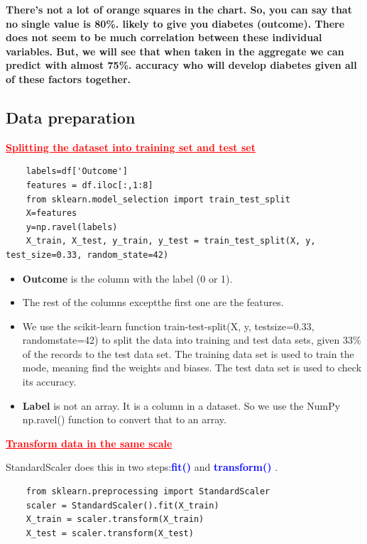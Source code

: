    \textbf{There’s not a lot of orange squares in the chart. 
    So, you can say that no single value is 80\%. 
    likely to give you diabetes (outcome). 
    There does not seem to be much correlation between these
     individual variables. But, we will see that when taken in 
     the aggregate we can predict with almost 75\%. accuracy 
    who will develop diabetes given all of these factors together.
   }
\subsection{Data preparation}
\label{sec:data}
\textcolor{red}{\underline{\textbf{Splitting the dataset into training set and test set}
}}
\begin{lstlisting}
    labels=df['Outcome']
    features = df.iloc[:,1:8]
    from sklearn.model_selection import train_test_split
    X=features
    y=np.ravel(labels)
    X_train, X_test, y_train, y_test = train_test_split(X, y, test_size=0.33, random_state=42) 
 \end{lstlisting}

 \begin{itemize}
    \item\textbf{Outcome} is the column with the label (0 or 1). 
    \item The rest of the columns exceptthe first one are the features.
    \item We use the scikit-learn function train-test-split(X, y, testsize=0.33, randomstate=42) to split the data into training and test data sets, given 33\% of the records to the test data set. The training data set is used to train the mode, meaning find the weights and biases. The test data set is used to check its accuracy.
    \item \textbf{Label} is not an array. It is a column in a dataset. So we use the NumPy np.ravel() function to convert that to an array.
\end{itemize}


\textcolor{red}{\underline{\textbf{Transform data in the same scale\\}}
}


StandardScaler does this in two steps:\textcolor{blue}{\textbf{fit()}} and \textcolor{blue}{\textbf{transform()} }.\\

\begin{lstlisting}
    from sklearn.preprocessing import StandardScaler
    scaler = StandardScaler().fit(X_train)
    X_train = scaler.transform(X_train)
    X_test = scaler.transform(X_test) 
\end{lstlisting}


